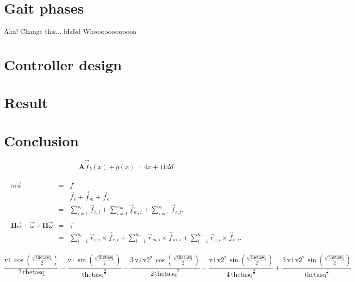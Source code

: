 \documentclass[a4paper,10pt]{article}
\begin{document}
\section{Gait phases}
Aha!
Change this...
fdsfsd
Whoooooooooooa~
\section{Controller design}


\section{Result}

\section{Conclusion}


\begin{equation}
\mathbf{A}\vec{\ddot{f}}_b(x) + g(x) = 4x + 11dd
\end{equation}

\begin{eqnarray*}
m\vec{a} & = & \vec{f} \\
         & = & \vec{f}_c+\vec{f}_m+\vec{f}_e \\
         & = & \sum_{i=1}^{n_c}{\vec{f}_{c,i}} + \sum_{i=1}^{n_m}{\vec{f}_{m,i}} + \sum_{i=1}^{n_e}{\vec{f}_{e,i}}. \\
\\
\mathbf{H}\vec\alpha + \vec\omega\times\mathbf{H}\vec\omega
         & = & \vec\tau \\
         & = & \sum_{i=1}^{n_c}{\vec{r}_{c,i}\times\vec{f}_{c,i}} + \sum_{i=1}^{n_m}{\vec{r}_{m,i}\times\vec{f}_{m,i}} + \sum_{i=1}^{n_e}{\vec{r}_{e,i}\times\vec{f}_{e,i}}. \\
\end{eqnarray*}

\begin{equation}
\frac{\mathrm{v1}\, \cos\!\left(\frac{\sqrt{\mathrm{thetasq}}}{2}\right)}{2\, \mathrm{thetasq}} - \frac{\mathrm{v1}\, \sin\!\left(\frac{\sqrt{\mathrm{thetasq}}}{2}\right)}{{\mathrm{thetasq}}^{\frac{3}{2}}} - \frac{3\, \mathrm{v1}\, {\mathrm{v2}}^2\, \cos\!\left(\frac{\sqrt{\mathrm{thetasq}}}{2}\right)}{2\, {\mathrm{thetasq}}^2} - \frac{\mathrm{v1}\, {\mathrm{v2}}^2\, \sin\!\left(\frac{\sqrt{\mathrm{thetasq}}}{2}\right)}{4\, {\mathrm{thetasq}}^{\frac{3}{2}}} + \frac{3\, \mathrm{v1}\, {\mathrm{v2}}^2\, \sin\!\left(\frac{\sqrt{\mathrm{thetasq}}}{2}\right)}{{\mathrm{thetasq}}^{\frac{5}{2}}}
\end{equation}
\end{document}
